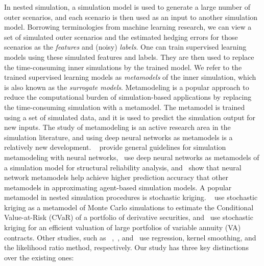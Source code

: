 \documentclass[]{article}
\begin{document}
In nested simulation, a simulation model is used to generate a large number of outer scenarios, and each scenario is then used as an input to another simulation model.
Borrowing terminologies from machine learning research, we can view a set of simulated outer scenarios and the estimated hedging errors for those scenarios as the \textit{features} and (noisy) \textit{labels}.
One can train supervised learning models using these simulated features and labels.
They are then used to replace the time-consuming inner simulations by the trained model.
We refer to the trained supervised learning models as \textit{metamodels} of the inner simulation, which is also known as the \textit{surrogate models}.
Metamodeling is a popular approach to reduce the computational burden of simulation-based applications by replacing the time-consuming simulation with a metamodel.
The metamodel is trained using a set of simulated data, and it is used to predict the simulation output for new inputs.
The study of metamodeling is an active research area in the simulation literature, and using deep neural networks as metamodels is a relatively new development.
~\cite{fonseca2003simulation} provide general guidelines for simulation metamodeling with neural networks,~\cite{lieu2022adaptive} use deep neural networks as metamodels of a simulation model for structural reliability analysis, and~\cite{salle2014efficient} show that neural network metamodels help achieve higher prediction accuracy that other metamodels in approximating agent-based simulation models.
A popular metamodel in nested simulation procedures is stochastic kriging.
~\cite{liu2010stochastic} use stochastic kriging as a metamodel of Monte Carlo simulations to estimate the Conditional Value-at-Risk (CVaR) of a portfolio of derivative securities, and~\cite{gan2015valuation} use stochastic kriging for an efficient valuation of large portfolios of variable annuity (VA) contracts.
Other studies, such as ~\cite{broadie2015risk},~\cite{hong2017kernel}, and~\cite{zhang2022sample} use regression, kernel smoothing, and the likelihood ratio method, respectively.
Our study has three key distinctions over the existing ones:
\end{document}
